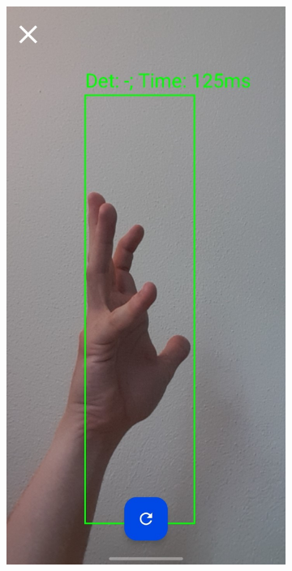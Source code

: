 \begin{figure}[H]
\begin{subfigure}{0.2\textwidth}
    \caption{}
    \label{fig:offline_valid_detection}
  \end{subfigure}
  \begin{subfigure}{0.2\textwidth}
    \includegraphics[width=\linewidth]{images/3-aplicatia-android/ffa_invalid_detection.jpeg}

\end{subfigure}
\end{figure}

